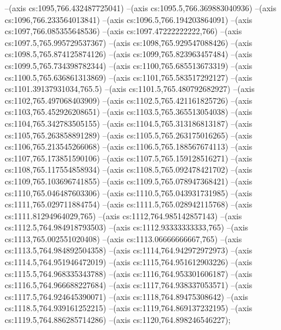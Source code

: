 --(axis cs:1095,766.432487725041)
--(axis cs:1095.5,766.369883040936)
--(axis cs:1096,766.233564013841)
--(axis cs:1096.5,766.194203864091)
--(axis cs:1097,766.085355648536)
--(axis cs:1097.47222222222,766)
--(axis cs:1097.5,765.995729537367)
--(axis cs:1098,765.929547088426)
--(axis cs:1098.5,765.874125874126)
--(axis cs:1099,765.823963457484)
--(axis cs:1099.5,765.734398782344)
--(axis cs:1100,765.685513673319)
--(axis cs:1100.5,765.636861313869)
--(axis cs:1101,765.583517292127)
--(axis cs:1101.39137931034,765.5)
--(axis cs:1101.5,765.480792682927)
--(axis cs:1102,765.497068403909)
--(axis cs:1102.5,765.421161825726)
--(axis cs:1103,765.452926208651)
--(axis cs:1103.5,765.365513054038)
--(axis cs:1104,765.342783505155)
--(axis cs:1104.5,765.313186813187)
--(axis cs:1105,765.263858891289)
--(axis cs:1105.5,765.263175016265)
--(axis cs:1106,765.213545266068)
--(axis cs:1106.5,765.188567674113)
--(axis cs:1107,765.173851590106)
--(axis cs:1107.5,765.159128516271)
--(axis cs:1108,765.117554858934)
--(axis cs:1108.5,765.092478421702)
--(axis cs:1109,765.103696741855)
--(axis cs:1109.5,765.078947368421)
--(axis cs:1110,765.046487603306)
--(axis cs:1110.5,765.043931731985)
--(axis cs:1111,765.029711884754)
--(axis cs:1111.5,765.028942115768)
--(axis cs:1111.81294964029,765)
--(axis cs:1112,764.985142857143)
--(axis cs:1112.5,764.984918793503)
--(axis cs:1112.93333333333,765)
--(axis cs:1113,765.002551020408)
--(axis cs:1113.06666666667,765)
--(axis cs:1113.5,764.984892504358)
--(axis cs:1114,764.942972972973)
--(axis cs:1114.5,764.951946472019)
--(axis cs:1115,764.951612903226)
--(axis cs:1115.5,764.968335343788)
--(axis cs:1116,764.953301606187)
--(axis cs:1116.5,764.966688227684)
--(axis cs:1117,764.938337053571)
--(axis cs:1117.5,764.924645390071)
--(axis cs:1118,764.89475308642)
--(axis cs:1118.5,764.939161252215)
--(axis cs:1119,764.869137232195)
--(axis cs:1119.5,764.886285714286)
--(axis cs:1120,764.898246546227);

